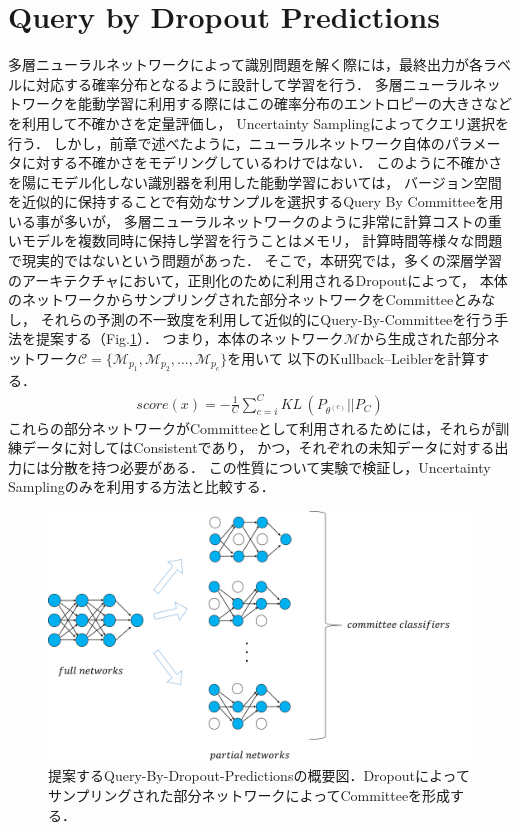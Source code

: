 \section{Query by Dropout Predictions}
多層ニューラルネットワークによって識別問題を解く際には，最終出力が各ラベルに対応する確率分布となるように設計して学習を行う．
多層ニューラルネットワークを能動学習に利用する際にはこの確率分布のエントロピーの大きさなどを利用して不確かさを定量評価し，
Uncertainty Samplingによってクエリ選択を行う．
しかし，前章で述べたように，ニューラルネットワーク自体のパラメータに対する不確かさをモデリングしているわけではない．
このように不確かさを陽にモデル化しない識別器を利用した能動学習においては，
バージョン空間を近似的に保持することで有効なサンプルを選択するQuery By Committeeを用いる事が多いが，
多層ニューラルネットワークのように非常に計算コストの重いモデルを複数同時に保持し学習を行うことはメモリ，
計算時間等様々な問題で現実的ではないという問題があった．
そこで，本研究では，多くの深層学習のアーキテクチャにおいて，正則化のために利用されるDropoutによって，
本体のネットワークからサンプリングされた部分ネットワークをCommitteeとみなし，
それらの予測の不一致度を利用して近似的にQuery-By-Committeeを行う手法を提案する（Fig.\ref{fig:query_by_dropout}）．
つまり，本体のネットワーク$\mathcal{M}$から生成された部分ネットワーク$\mathcal{C} = \{\mathcal{M}_{p_1}, \mathcal{M}_{p_2}, \dots, \mathcal{M}_{p_c} \}$を用いて
以下のKullback–Leiblerを計算する．
\begin{eqnarray}
    score(x) =  -  \frac{1}{C} \sum_{c=i}^C KL \, (P_{\theta^{(c)}} || P_C)
\end{eqnarray}
これらの部分ネットワークがCommitteeとして利用されるためには，それらが訓練データに対してはConsistentであり，
かつ，それぞれの未知データに対する出力には分散を持つ必要がある．
この性質について実験で検証し，Uncertainty Samplingのみを利用する方法と比較する．

\begin{figure}[tbp]
     \begin{center}
      \includegraphics[width=120mm]{figures/query_by_dropout.png}
     \end{center}
    \caption{\label{fig:query_by_dropout}提案するQuery-By-Dropout-Predictionsの概要図．Dropoutによってサンプリングされた部分ネットワークによってCommitteeを形成する．}
\end{figure}


